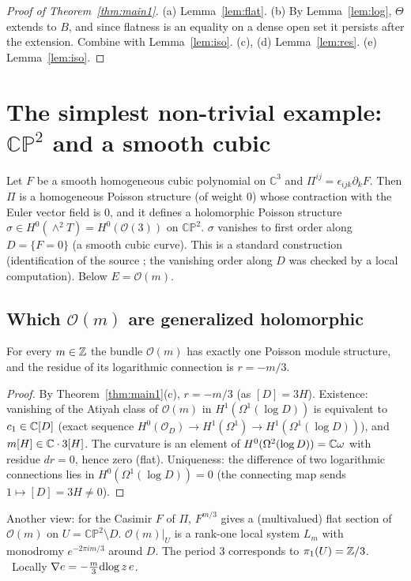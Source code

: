 \begin{proof}[Proof of Theorem~\ref{thm:main1}]
(a) Lemma~\ref{lem:flat}. (b) By Lemma~\ref{lem:log}, $\Theta$ extends to $B$, and since flatness is an equality on a dense open set it persists after the extension. Combine with Lemma~\ref{lem:iso}. (c), (d) Lemma~\ref{lem:res}. (e) Lemma~\ref{lem:iso}.
\end{proof}

\section{The simplest non-trivial example: $\mathbb{CP}^2$ and a smooth cubic}\label{sec:cp2}
Let $F$ be a smooth homogeneous cubic polynomial on $\mathbb C^3$ and $\Pi^{ij}=\epsilon_{ijk}\partial_kF$. Then $\Pi$ is a homogeneous Poisson structure (of weight 0) whose contraction with the Euler vector field is $0$, and it defines a holomorphic Poisson structure $\sigma\in H^0(\wedge^2T)=H^0(\mathcal O(3))$ on $\mathbb{CP}^2$. $\sigma$ vanishes to first order along $D=\{F=0\}$ (a smooth cubic curve). This is a standard construction (identification of the source \tQ; the vanishing order along $D$ was checked by a local computation). Below $E=\mathcal O(m)$.

\subsection{Which $\mathcal O(m)$ are generalized holomorphic}
\begin{prop}\tP\label{prop:cp2mod}
For every $m\in\mathbb Z$ the bundle $\mathcal O(m)$ has exactly one Poisson module structure, and the residue of its logarithmic connection is $r=-m/3$.
\end{prop}
\begin{proof}
By Theorem~\ref{thm:main1}(c), $r=-m/3$ (as $[D]=3H$). Existence: vanishing of the Atiyah class of $\mathcal O(m)$ in $H^1(\Omega^1(\log D))$ is equivalent to $c_1\in\mathbb C[D]$ (exact sequence $H^0(\mathcal O_D)\to H^1(\Omega^1)\to H^1(\Omega^1(\log D))$), and $m[H]\in\mathbb C\cdot3[H]$. The curvature is an element of $H^0(\Omega^2(\log D))=\mathbb C\omega$ with residue $dr=0$, hence zero (flat). Uniqueness: the difference of two logarithmic connections lies in $H^0(\Omega^1(\log D))=0$ (the connecting map sends $1\mapsto[D]=3H\ne0$).\qedhere
\end{proof}
Another view: for the Casimir $F$ of $\Pi$, $F^{m/3}$ gives a (multivalued) flat section of $\mathcal O(m)$ on $U=\mathbb{CP}^2\setminus D$. $\mathcal O(m)|_U$ is a rank-one local system $L_m$ with monodromy $e^{-2\pi im/3}$ around $D$. The period 3 corresponds to $\pi_1(U)=\mathbb Z/3$. \tP\ Locally $\nabla e=-\tfrac m3\mathrm{dlog}\, z\,e$.


